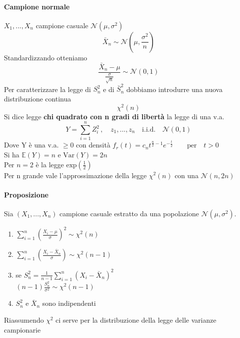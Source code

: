 \documentclass[12pt, a4paper, openany]{book}
\begin{document}
\paragraph*{Campione normale}
$X_1, ..., X_n$ campione casuale $\mathcal{N}(\mu, \sigma^2)$
\begin{equation*}
    \bar{X}_n \sim \mathcal{N}(\mu, \frac{\sigma^2}{n})
\end{equation*}
Standardizzando otteniamo
\begin{equation*}
    \frac{\bar{X}_n-\mu}{\frac{\sigma}{\sqrt{n}}} \sim \mathcal{N}(0,1)
\end{equation*}
Per caratterizzare la legge di $S_{n}^2$ e di $\bar{S}_{n}^2$ dobbiamo
introdurre una nuova distribuzione continua
\begin{equation*}
    \chi^2(n)
\end{equation*}
Si dice legge \textbf{chi quadrato con n gradi di libertà} la legge di una v.a.
\begin{equation*}
    Y = \sum_{i=1}^n Z_{i}^2 \,, \quad z_1, ..., z_n \quad \text{i.i.d.}\quad \mathcal{N}(0,1)
\end{equation*}
Dove Y è una v.a. $\geq 0$ con densità $f_r(t) = c_n t^{\frac{n}{2}-1} e^{-\frac{t}{2}} 
\qquad \text{per} \quad t>0$
\\ Si ha $\mathbb{E}(Y) = n$ e $\text{Var}(Y)=2n$
\\ Per $n = 2$ è la legge $\text{exp}(\frac{1}{2})$
\\ Per n grande vale l'approssimazione della legge $\chi^2(n)$ con una
$\mathcal{N}(n,2n)$
\paragraph*{Proposizione} Sia $(X_1, ..., X_n)$ campione casuale estratto
da una popolazione $\mathcal{N}(\mu, \sigma^2)$.
\begin{enumerate}
    \item $\sum_{i=1}^n(\frac{X_i-\mu}{\sigma})^2 \sim \chi^2(n)$
    \item $\sum_{i=1}^n(\frac{X_i-\bar{X}_n}{\sigma}) \sim \chi^2(n-1)$
    \item se $S_{n}^2 = \frac{1}{n-1}\sum_{i=1}^n(X_i - \bar{X}_n)^2$
    \\ $(n-1)\frac{S_{n}^2}{\sigma^2} \sim \chi^2(n-1)$
    \item $S_{n}^2$ e $\bar{X}_n$ sono indipendenti
\end{enumerate}
Riassumendo $\chi^2$ ci serve per la distribuzione della legge delle varianze campionarie
\end{document}
